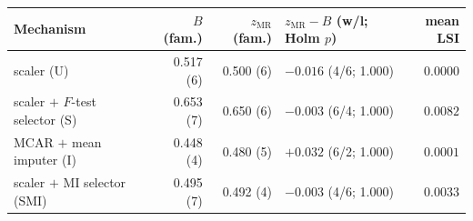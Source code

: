 \begin{tabular}{lrrlr}
\toprule
Mechanism & $B$ (fam.) & $z_{\mathrm{MR}}$ (fam.) & $z_{\mathrm{MR}}-B$ (w/l; Holm $p$) & mean LSI\\
\midrule
scaler (U) & 0.517 (6) & 0.500 (6) & $-0.016$ (4/6; 1.000) & $0.0000$\\
scaler $+$ $F$-test selector (S) & 0.653 (7) & 0.650 (6) & $-0.003$ (6/4; 1.000) & $0.0082$\\
MCAR $+$ mean imputer (I) & 0.448 (4) & 0.480 (5) & $+0.032$ (6/2; 1.000) & $0.0001$\\
scaler $+$ MI selector (SMI) & 0.495 (7) & 0.492 (4) & $-0.003$ (4/6; 1.000) & $0.0033$\\
\bottomrule
\end{tabular}
